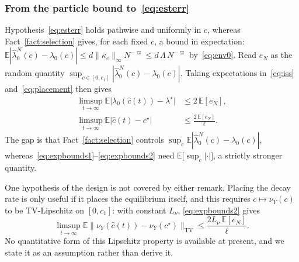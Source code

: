 \documentclass[letterpaper, 10pt, conference]{ieeeconf}
\newtheorem{remark}{\it \textbf{Remark}}
\newcommand{\E}{\mathbb{E}}
\newcommand{\Lbar}{\Lambda}
\newcommand{\rev}[1]{#1}
\begin{document}
\subsubsection*{From the particle bound to~\eqref{eq:esterr}}
\rev{Hypothesis~\eqref{eq:esterr} holds pathwise and uniformly in $c$, whereas
Fact~\ref{fact:selection} gives, for each fixed $c$, a bound in expectation:
$\E|\widehat\lambda_0^N(c)-\lambda_0(c)|\le d\|\kappa_c\|_\infty N^{-\varpi}
\le d\,\Lbar\,N^{-\varpi}$ by~\eqref{eq:env0}. Read $e_N$ as the random
quantity $\sup_{c\in[0,c_1]}|\widehat\lambda_0^N(c)-\lambda_0(c)|$. Taking
expectations in~\eqref{eq:iss} and~\eqref{eq:placement} then gives}
\begin{align}
\rev{\limsup_{t\to\infty}\E\bigl|\lambda_0(\widehat c(t))-\lambda^\star\bigr|}
&\le2\,\E[e_N],\label{eq:expbounds1}\\
\limsup_{t\to\infty}\E\bigl|\widehat c(t)-c^\star\bigr|
&\le\frac{2\,\E[e_N]}{\ell}.\label{eq:expbounds2}
\end{align}
\rev{The gap is that Fact~\ref{fact:selection} controls $\sup_{c}\E|\widehat\lambda_0^N(c)-\lambda_0(c)|$, whereas~\eqref{eq:expbounds1}--\eqref{eq:expbounds2} need $\E\bigl[\sup_{c}|\cdot|\bigr]$, a strictly stronger quantity.}

\rev{One hypothesis of the design is not covered by either remark. Placing the
decay rate is only useful if it places the equilibrium itself, and this
requires $c\mapsto\nu_Y(c)$ to be TV-Lipschitz on $[0,c_1]$: with constant
$L_\nu$, \eqref{eq:expbounds2} gives}
\[
\rev{\limsup_{t\to\infty}
\E\bigl\|\nu_Y(\widehat c(t))-\nu_Y(c^\star)\bigr\|_{\mathrm{TV}}
\le\frac{2L_\nu\,\E[e_N]}{\ell}.}
\]
\rev{No quantitative form of this Lipschitz property is available at present,
and we state it as an assumption rather than derive it.}


\end{document}
